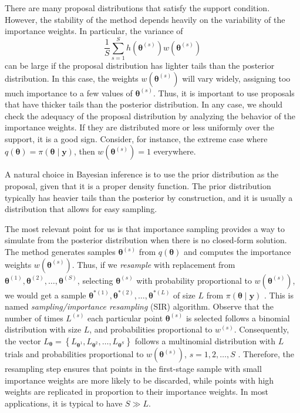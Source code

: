 There are many proposal distributions that satisfy the support condition. However, the stability of the method depends heavily on the variability of the importance weights. In particular, the variance of  
\[
\frac{1}{S}\sum_{s=1}^S h(\bm{\theta}^{(s)})w(\bm{\theta}^{(s)})
\]  
can be large if the proposal distribution has lighter tails than the posterior distribution. In this case, the weights \( w(\bm{\theta}^{(s)}) \) will vary widely, assigning too much importance to a few values of \( \bm{\theta}^{(s)} \). Thus, it is important to use proposals that have thicker tails than the posterior distribution. In any case, we should check the adequacy of the proposal distribution by analyzing the behavior of the importance weights. If they are distributed more or less uniformly over the support, it is a good sign. Consider, for instance, the extreme case where $q(\bm{\theta}) = \pi(\bm{\theta}\mid \bm{y})$, then $w(\bm{\theta}^{(s)}) = 1$ everywhere. 

A natural choice in Bayesian inference is to use the prior distribution as the proposal, given that it is a proper density function. The prior distribution typically has heavier tails than the posterior by construction, and it is usually a distribution that allows for easy sampling.

The most relevant point for us is that importance sampling provides a way to simulate from the posterior distribution when there is no closed-form solution. The method generates samples $\bm{\theta}^{(s)}$ from $q(\bm{\theta})$ and computes the importance weights $w(\bm{\theta}^{(s)})$. Thus, if we \textit{resample} with replacement from $\bm{\theta}^{(1)},\bm{\theta}^{(2)},\dots,\bm{\theta}^{(S)}$, selecting $\bm{\theta}^{(s)}$ with probability proportional to  $w(\bm{\theta}^{(s)})$, we would get a sample $\bm{\theta}^{*(1)},\bm{\theta}^{*(2)},\dots,\bm{\theta}^{*(L)}$ of size $L$ from $\pi(\bm{\theta}\mid \bm{y})$ \cite{smith1992bayesian,rubin1988sir}. This is named \textit{sampling/importance resampling} (SIR) algorithm. Observe that the number of times $L^{(s)}$ each particular point $\bm{\theta}^{(s)}$ is selected follows a binomial distribution with size $L$, and probabilities proportional to $w^{(s)}$. Consequently, the vector $L_{\bm{\theta}} = \left\{L_{\bm{\theta}^1}, L_{\bm{\theta}^2}, \dots, L_{\bm{\theta}^S}\right\}$ follows a multinomial distribution with $L$ trials and probabilities proportional to $w(\bm{\theta}^{(s)})$, $s = 1, 2, \dots, S$ \cite{cappe2007overview}. Therefore, the resampling step ensures that points in the first-stage sample with small importance weights are more likely to be discarded, while points with high weights are replicated in proportion to their importance weights. In most applications, it is typical to have $S \gg L$.


